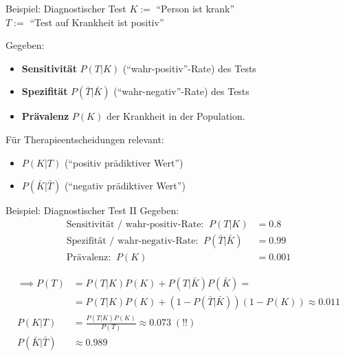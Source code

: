 \documentclass[
  10pt,
  ignorenonframetext,
]{beamer}
\providecommand{\tightlist}{%
  \setlength{\itemsep}{0pt}\setlength{\parskip}{0pt}}
\begin{document}
\begin{frame}{Beispiel: Diagnostischer Test}
\label{beispiel-diagnostischer-test}
\(K:=\) ``Person ist krank''\\
\(T:=\) ``Test auf Krankheit ist positiv''

Gegeben:

\begin{itemize}
\tightlist
\item
  \textbf{Sensitivität} \(P(T|K)\) (``wahr-positiv''-Rate) des Tests
\item
  \textbf{Spezifität} \(P(\bar{T}|\bar{K})\) (``wahr-negativ''-Rate) des
  Tests
\item
  \textbf{Prävalenz} \(P(K)\) der Krankheit in der Population.
\end{itemize}

Für Therapieentscheidungen relevant:

\begin{itemize}
\tightlist
\item
  \(P(K|T)\) (``positiv prädiktiver Wert'')
\item
  \(P(\bar K|\bar T)\) (``negativ prädiktiver Wert'')
\end{itemize}
\end{frame}

\begin{frame}{Beispiel: Diagnostischer Test II}
\label{beispiel-diagnostischer-test-ii}
Gegeben: \begin{align*}
\text{Sensitivität / wahr-positiv-Rate:} \;\;P(T|K) &= 0.8 \\
\text{Spezifität / wahr-negativ-Rate:}\;\; P(\bar{T}|\bar{K}) &= 0.99 \\
\text{Prävalenz:} \;\; P(K) &= 0.001
\end{align*}

\begin{align*}
\implies P(T)  & =  P(T|K)P(K) + P(T|\bar{K})P(\bar{K})  =  \\
      & = P(T|K)P(K) + (1-P(\bar{T}|\bar{K}))(1-P(K)) \approx  0.011 \\
P(K|T) & =  \frac{P(T|K)P(K)}{P(T)} \approx  0.073 \; (!!)  \\
P(\bar{K}|\bar{T}) &\approx  0.989
\end{align*}
\end{frame}
\end{document}
